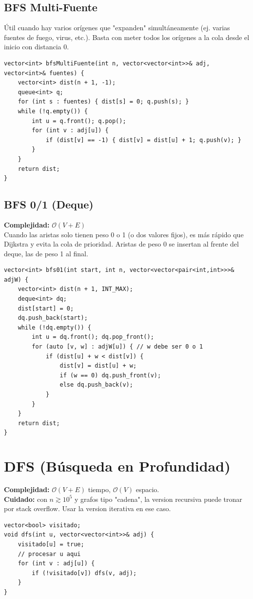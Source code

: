 \documentclass[10pt,twocolumn,letterpaper]{report}
\begin{document}
\subsection{BFS Multi-Fuente}
Útil cuando hay varios orígenes que "expanden" simultáneamente (ej. varias fuentes de fuego, virus, etc.). Basta con meter todos los orígenes a la cola desde el inicio con distancia 0.
\begin{lstlisting}
vector<int> bfsMultiFuente(int n, vector<vector<int>>& adj, vector<int>& fuentes) {
    vector<int> dist(n + 1, -1);
    queue<int> q;
    for (int s : fuentes) { dist[s] = 0; q.push(s); }
    while (!q.empty()) {
        int u = q.front(); q.pop();
        for (int v : adj[u]) {
            if (dist[v] == -1) { dist[v] = dist[u] + 1; q.push(v); }
        }
    }
    return dist;
}
\end{lstlisting}

\subsection{BFS 0/1 (Deque)}
\textbf{Complejidad:} $\mathcal{O}(V + E)$ \\
Cuando las aristas solo tienen peso 0 o 1 (o dos valores fijos), es más rápido que Dijkstra y evita la cola de prioridad. Aristas de peso 0 se insertan al frente del deque, las de peso 1 al final.
\begin{lstlisting}
vector<int> bfs01(int start, int n, vector<vector<pair<int,int>>>& adjW) {
    vector<int> dist(n + 1, INT_MAX);
    deque<int> dq;
    dist[start] = 0;
    dq.push_back(start);
    while (!dq.empty()) {
        int u = dq.front(); dq.pop_front();
        for (auto [v, w] : adjW[u]) { // w debe ser 0 o 1
            if (dist[u] + w < dist[v]) {
                dist[v] = dist[u] + w;
                if (w == 0) dq.push_front(v);
                else dq.push_back(v);
            }
        }
    }
    return dist;
}
\end{lstlisting}

\section{DFS (Búsqueda en Profundidad)}
\textbf{Complejidad:} $\mathcal{O}(V + E)$ tiempo, $\mathcal{O}(V)$ espacio. \\
\textbf{Cuidado:} con $n \gtrsim 10^5$ y grafos tipo "cadena", la version recursiva puede tronar por stack overflow. Usar la version iterativa en ese caso.
\begin{lstlisting}
vector<bool> visitado;
void dfs(int u, vector<vector<int>>& adj) {
    visitado[u] = true;
    // procesar u aqui
    for (int v : adj[u]) {
        if (!visitado[v]) dfs(v, adj);
    }
}
\end{lstlisting}
\end{document}
